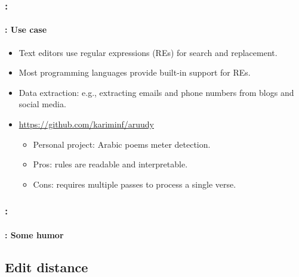 \documentclass[xcolor=table]{beamer}
\begin{document}
\begin{frame}
	\frametitle{\insertshortsubtitle: \insertsection}
	\framesubtitle{\insertsubsection: Use case}
	
	\begin{itemize}
		\item Text editors use regular expressions (REs) for search and replacement.
		\item Most programming languages provide built-in support for REs.
		\item Data extraction: e.g., extracting emails and phone numbers from blogs and social media.
		\item \url{https://github.com/kariminf/aruudy}
		\begin{itemize}
			\item Personal project: Arabic poems meter detection.
			\item Pros: rules are readable and interpretable.
			\item Cons: requires multiple passes to process a single verse.
		\end{itemize}
	\end{itemize}

\end{frame}

\begin{frame}
	\frametitle{\insertshortsubtitle: \insertsection}
	\framesubtitle{\insertsubsection: Some humor}

	\begin{center}
	\end{center}

\end{frame}

\subsection{Edit distance}
\end{document}
